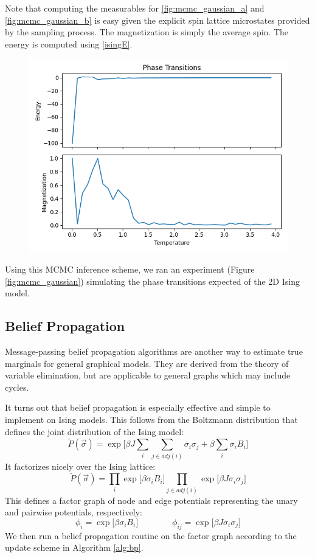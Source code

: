 \documentclass{article}
\begin{document}
Note that computing the measurables for \ref{fig:mcmc_gaussian_a} and 
\ref{fig:mcmc_gaussian_b} is easy given the explicit spin lattice microstates 
provided by the sampling process. 
The magnetization is simply the average spin. 
The energy is computed using \ref{isingE}. 

\begin{figure}
    \includegraphics[width=\textwidth]{mcmc_phase}
    \label{fig:mcmc_phase}
\end{figure}

Using this MCMC inference scheme, we ran an experiment (Figure 
\ref{fig:mcmc_gaussian}) simulating the phase transitions expected of the 2D 
Ising model. 


%
%
%
%
%
\subsection{Belief Propagation}
%
%
%
%
%
Message-passing belief propagation algorithms are another way to estimate true 
marginals for general graphical models. 
They are derived from the theory of variable elimination, but are applicable to 
general graphs which may include cycles. 

It turns out that belief propagation is especially effective and simple to 
implement on Ising models. 
This follows from the Boltzmann distribution that defines the joint distribution 
of the Ising model:
\begin{equation}\label{isingJoint}
    \tilde{P}(\vec{\sigma}) = \exp \Bigr [\beta J\sum_i \sum_{j \in adj(i)} \sigma_i \sigma_j + \beta \sum_i \sigma_i B_i \Bigr ]
\end{equation}
It factorizes nicely over the Ising lattice:
\begin{equation}\label{gibbsFactorization}
    \tilde{P}(\vec{\sigma}) = \prod_i \exp \Bigr [\beta \sigma_i B_i \Bigr ] \prod_{j \in adj(i)} \exp \Bigr [ \beta J \sigma_i \sigma_j \Bigr ]
\end{equation}
This defines a factor graph of node and edge potentials representing the unary 
and pairwise potentials, respectively:
\[
    \phi_i = \exp \Bigr [\beta \sigma_i B_i \Bigr ]
    \qquad \qquad
    \phi_{ij} = \exp \Bigr [ \beta J \sigma_i \sigma_j \Bigr ]
\]
We then run a belief propagation routine on the factor graph according to the 
update scheme in Algorithm \ref{alg:bp}. 
\end{document}
